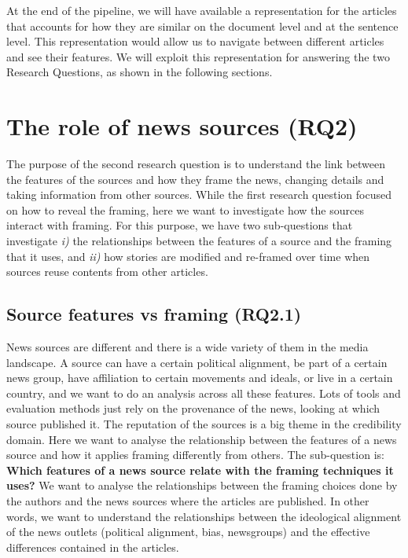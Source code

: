At the end of the pipeline, we will have available a representation for the articles that accounts for how they are similar on the document level and at the sentence level.
This representation would allow us to navigate between different articles and see their features. We will exploit this representation for answering the two Research Questions, as shown in the following sections.


\section{The role of news sources (RQ2)}
\label{sec:prop_rq2}

The purpose of the second research question is to understand the link between the features of the sources and how they frame the news, changing details and taking information from other sources.
While the first research question focused on how to reveal the framing, here we want to investigate how the sources interact with framing. For this purpose, we have two sub-questions that investigate \emph{i)} the relationships between the features of a source and the framing that it uses, and \emph{ii)} how stories are modified and re-framed over time when sources reuse contents from other articles.

\subsection{Source features vs framing (RQ2.1)}
News sources are different and there is a wide variety of them in the media landscape.
A source can have a certain political alignment, be part of a certain news group, have affiliation to certain movements and ideals, or live in a certain country, and we want to do an analysis across all these features.
Lots of tools and evaluation methods just rely on the provenance of the news, looking at which source published it. The reputation of the sources is a big theme in the credibility domain.
Here we want to analyse the relationship between the features of a news source and how it applies framing differently from others. The sub-question is:
\textbf{Which features of a news source relate with the framing techniques it uses?}
We want to analyse the relationships between the framing choices done by the authors and the news sources where the articles are published. In other words, we want to understand the relationships between the ideological alignment of the news outlets (political alignment, bias, newsgroups) and the effective differences contained in the articles.


